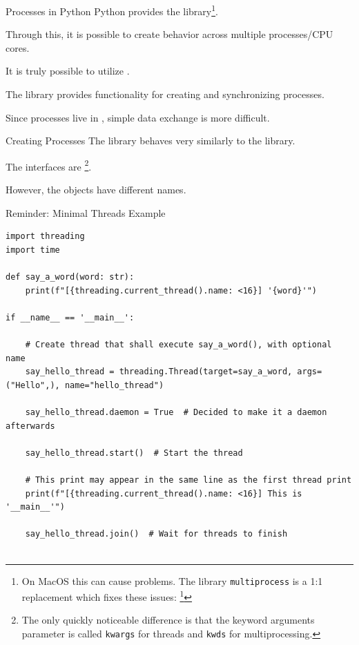 \documentclass[12pt, aspectratio=169, usepdftitle=false, handout]{beamer}
\newcommand{\pp}[1]{\lpl{#1}}
\newcommand{\furl}[1]{\footnote{\url{#1}}}
\begin{document}
\begin{frame}[fragile]{Processes in Python}
        Python provides the  library\footnote{On MacOS this can cause problems. The library \texttt{multiprocess} is a 1:1 replacement which fixes these issues: \furl{https://pypi.org/project/multiprocess/}}.

		\pause
		\medskip
		
		Through this, it is possible to create  behavior across multiple processes/CPU cores.
		\pause
		
		\medskip
		
		It is truly possible to utilize .
		
		\pause
		\medskip
		
		The library provides functionality for creating and synchronizing processes.
		
		\pause
		\medskip
		
		Since processes live in , simple data exchange is more difficult.

\end{frame}



\begin{frame}[fragile]{Creating Processes}
        The \pp{multiprocessing} library behaves very similarly to the \pp{threading} library.

		\medskip
		
		The interfaces are \footnote{The only quickly noticeable difference is that the keyword arguments parameter is called \texttt{kwargs} for threads and \texttt{kwds} for multiprocessing.}.
		
		\medskip
		
		However, the objects have different names.

\end{frame}


\begin{frame}[fragile]{Reminder: Minimal Threads Example}
	\begin{lstlisting}[language=pytiny]
import threading
import time

def say_a_word(word: str):
    print(f"[{threading.current_thread().name: <16}] '{word}'")

if __name__ == '__main__':

    # Create thread that shall execute say_a_word(), with optional name
    say_hello_thread = threading.Thread(target=say_a_word, args=("Hello",), name="hello_thread")
    
    say_hello_thread.daemon = True  # Decided to make it a daemon afterwards

    say_hello_thread.start()  # Start the thread

    # This print may appear in the same line as the first thread print
    print(f"[{threading.current_thread().name: <16}] This is '__main__'")

    say_hello_thread.join()  # Wait for threads to finish
		
	\end{lstlisting}
\end{frame}
\end{document}
